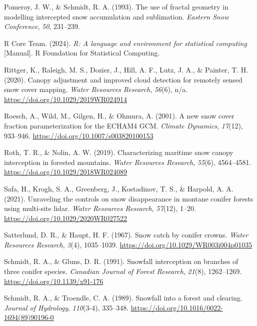 \documentclass[
  letterpaper,
  DIV=11,
  numbers=noendperiod]{scrartcl}
\newlength{\cslhangindent}
\newenvironment{CSLReferences}[2] %
 {\begin{list}{}{%
  \setlength{\itemindent}{0pt}
  \setlength{\leftmargin}{0pt}
  \setlength{\parsep}{0pt}
  \ifodd #1
   \setlength{\leftmargin}{\cslhangindent}
   \setlength{\itemindent}{-1\cslhangindent}
  \fi
  \setlength{\itemsep}{#2\baselineskip}}}
 {\end{list}}
\begin{document}
\begin{CSLReferences}{1}{0}
Pomeroy, J. W., \& Schmidt, R. A. (1993). The use of fractal geometry in
modelling intercepted snow accumulation and sublimation. \emph{Eastern
Snow Conference}, \emph{50}, 231--239.

R Core Team. (2024). \emph{R: A language and environment for statistical
computing} {[}Manual{]}. R Foundation for Statistical Computing.

Rittger, K., Raleigh, M. S., Dozier, J., Hill, A. F., Lutz, J. A., \&
Painter, T. H. (2020). Canopy adjustment and improved cloud detection
for remotely sensed snow cover mapping. \emph{Water Resources Research},
\emph{56}(6), n/a. \url{https://doi.org/10.1029/2019WR024914}

Roesch, A., Wild, M., Gilgen, H., \& Ohmura, A. (2001). A new snow cover
fraction parameterization for the {ECHAM4 GCM}. \emph{Climate Dynamics},
\emph{17}(12), 933--946. \url{https://doi.org/10.1007/s003820100153}

Roth, T. R., \& Nolin, A. W. (2019). Characterizing maritime snow canopy
interception in forested mountains. \emph{Water Resources Research},
\emph{55}(6), 4564--4581. \url{https://doi.org/10.1029/2018WR024089}

Safa, H., Krogh, S. A., Greenberg, J., Kostadinov, T. S., \& Harpold, A.
A. (2021). Unraveling the controls on snow disappearance in montane
conifer forests using multi-site lidar. \emph{Water Resources Research},
\emph{57}(12), 1--20. \url{https://doi.org/10.1029/2020WR027522}

Satterlund, D. R., \& Haupt, H. F. (1967). Snow catch by conifer crowns.
\emph{Water Resources Research}, \emph{3}(4), 1035--1039.
\url{https://doi.org/10.1029/WR003i004p01035}

Schmidt, R. A., \& Gluns, D. R. (1991). Snowfall interception on
branches of three conifer species. \emph{Canadian Journal of Forest
Research}, \emph{21}(8), 1262--1269.
\url{https://doi.org/10.1139/x91-176}

Schmidt, R. A., \& Troendle, C. A. (1989). Snowfall into a forest and
clearing. \emph{Journal of Hydrology}, \emph{110}(3-4), 335--348.
\url{https://doi.org/10.1016/0022-1694(89)90196-0}


\end{CSLReferences}
\end{document}
